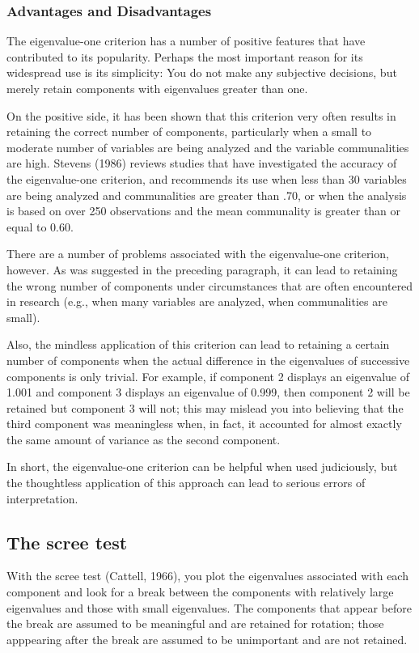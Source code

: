 \documentclass[a4paper,12pt]{article}
\begin{document}
	
	\subsubsection{Advantages and Disadvantages}
	The eigenvalue-one criterion has a number of positive features that have contributed to its
	popularity.  Perhaps the most important reason for its widespread use is its simplicity:  You do
	not make any subjective decisions, but merely retain components with eigenvalues greater than
	one.
	
	On the positive side, it has been shown that this criterion very often results in retaining the
	correct number of components, particularly when a small to moderate number of variables are
	being analyzed and the variable communalities are high.  Stevens (1986) reviews studies that
	have investigated the accuracy of the eigenvalue-one criterion, and recommends its use when
	less than 30 variables are being analyzed and communalities are greater than .70, or when the
	analysis is based on over 250 observations and the mean communality is greater than or equal to
	0.60.
	
	There are a number of problems associated with the eigenvalue-one criterion, however.  As was
	suggested in the preceding paragraph, it can lead to retaining the wrong number of components
	under circumstances that are often encountered in research (e.g., when many variables are
	analyzed, when communalities are small).
	
	Also, the mindless application of this criterion can
	lead to retaining a certain number of components when the actual difference in the eigenvalues
	of successive components is only trivial.  For example, if component 2 displays an eigenvalue of
	1.001 and component 3 displays an eigenvalue of 0.999, then component 2 will be retained but
	component 3 will not; this may mislead you into believing that the third component was
	meaningless when, in fact, it accounted for almost exactly the same amount of variance as the
	second component.
	
	In short, the eigenvalue-one criterion can be helpful when used judiciously,
	but the thoughtless application of this approach can lead to serious errors of interpretation.
	
	\subsection{The scree test} With the scree test (Cattell, 1966), you plot the eigenvalues associated with
	each component and look for a break between the components with relatively large
	eigenvalues and those with small eigenvalues.  The components that appear before the break are
	assumed to be meaningful and are retained for rotation; those apppearing after the break are
	assumed to be unimportant and are not retained.
	
\end{document}
